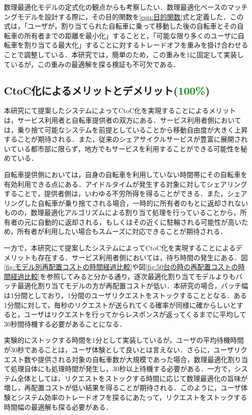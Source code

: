       \par 数理最適化モデルの定式化の観点からも考察したい．数理最適化ベースのマッチングモデルを設計する際に，その目的関数を\ref{equ:目的関数}式と定義した．この式は，「ユーザが，割り当てられた自転車に乗って移動した後の自転車とその自転車の所有者までの距離を最小化」することと，「可能な限り多くのユーザに自転車を割り当てる最大化」することに対するトレードオフを重みを掛け合わせることで調整している．本研究では，簡単のため，この重みを1に固定して実装しているが，この重みの最適解を探る検証も不可欠である．
      
  \subsection{CtoC化によるメリットとデメリット(\textcolor{green}{100\%})}
    \label{sec:CtoC化によるメリットとデメリット}
      \par 本研究にて提案したシステムによってCtoC化を実現することによるメリットは，サービス利用者と自転車提供者の双方にある．サービス利用者側においては，乗り捨て可能なシステムを前提としていることから移動自由度が大きく上昇することが期待される．また，従来のシェアサイクルサービスが豊富に展開されいている都市部に限らず，地方でもサービスを利用することができる可能性を秘めている．
      \par 自転車提供側においては，自身の自転車を利用していない時間帯にその自転車を有効利用できる点にある．アイドルタイムが発生する対象に対してシェアリングすることで，提供者側は，いわゆる不労所得を得ることができる．また，シェアリングした自転車が乗り捨てされる場合，一時的に所有者のもとに返却されないものの，数理最適化アルゴリズムによる割り当て処理を行っていることから，所有者の元に自動的に返却される，もしくはその近くに駐輪される可能性が高いため，所有者が利用したい場合もスムーズに対応できることが期待される．
      \par 一方で，本研究にて提案したシステムによってCtoC化を実現することによるデメリットも存在する．サービス利用者側においては，待ち時間の発生にある．図\ref{fig:モデル別再配置コストの時間経過比較}や図\ref{fig:50台の時の再配置コストの時間経過比較}を参照してみると分かる通り，逐次最適化割り当てモデルよりもバッチ最適化割り当てモデルの方が再配置コストが低い．本研究の場合，バッチ幅は1分間としており，1分間のユーザリクエストをストックすることとなる．ある1分間に対して，毎秒のリクエストが送られてくる確率が同様に確からしいとすると，ユーザはリクエストを行ってからレスポンスが返ってくるまでに平均して30秒間待機する必要があることになる．
      \par 実験的にストックする時間を1分として実装しているが，ユーザの平均待機時間が30秒であることは，ユーザ体験として良いとは言えない．さらに，ユーザリクエスト数や提供される対象の自転車数が大規模であった場合，数理最適化割り当て処理自体にも処理時間が発生し，30秒以上待機する必要がある．一方で，システム全体としては，リクエストをストックする時間に応じて数理最適化の旨味が増し，再配置コストが低い結果を得ることが期待される．このように，ユーザ体験とシステム効率のトレードオフを探るにあたって，リクエストをストックする時間幅の最適解も探る必要がある．
